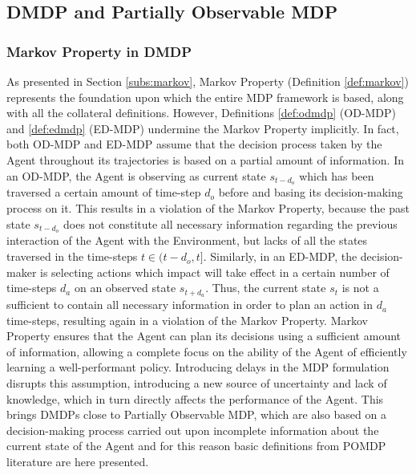         \subsection{DMDP and Partially Observable MDP}
            \subsubsection{Markov Property in DMDP}
                \label{subs:markovmdp}
                As presented in Section \ref{subs:markov}, Markov Property (Definition \ref{def:markov}) represents the foundation upon which the entire MDP framework is based, along with all the collateral definitions. However, 
                Definitions \ref{def:odmdp} (OD-MDP) and \ref{def:edmdp} (ED-MDP) undermine the Markov Property implicitly. In fact, both OD-MDP and ED-MDP assume that the decision process taken by the Agent throughout its trajectories is based on a partial amount of information. \newline
                In an OD-MDP, the Agent is observing as current state $s_{t-d_{o}}$ which has been traversed a certain amount of time-step $d_o$ before and basing its decision-making process on it. This results in a violation of the Markov Property, because the past state $s_{t-d_{o}}$ does not constitute all necessary information regarding the previous interaction of the Agent with the Environment, but lacks of all the states traversed in the time-steps $t \in (t-d_{o}, t]$. Similarly, in an ED-MDP, the decision-maker is selecting actions which impact will take effect in a certain number of time-steps $d_a$ on an observed state $s_{t+d_{a}}$. Thus, the current state $s_t$ is not a sufficient to contain all necessary information in order to plan an action in $d_{a}$ time-steps, resulting again in a violation of the Markov Property. \newline
                Markov Property ensures that the Agent can plan its decisions using a sufficient amount of information, allowing a complete focus on the ability of the Agent of efficiently learning a well-performant policy. Introducing delays in the MDP formulation disrupts this assumption, introducing a new source of uncertainty and lack of knowledge, which in turn directly affects the performance of the Agent. This brings DMDPs close to Partially Observable MDP, which are also based on a decision-making process carried out upon incomplete information about the current state of the Agent and for this reason basic definitions from POMDP literature are here presented.
        
